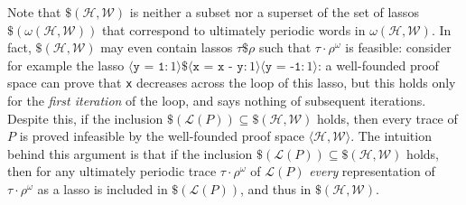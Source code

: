 \documentclass[9pt,nocopyrightspace]{sigplanconf}
\theoremstyle{definition}
\newcommand{\tuple}[1]{\langle #1 \rangle}
\newcommand{\rankformulas}{\mathscr{W}}
\newcommand{\ic}[2]{{\tuple{#1 : #2}}}
\newcommand{\lang}{\mathcal{L}}
\begin{document}
Note that $\$(\mathscr{H},\rankformulas)$ is neither a subset nor a superset of the set of
lassos $\$(\omega(\mathscr{H},\rankformulas))$ that correspond to ultimately periodic
words in $\omega(\mathscr{H},\rankformulas)$.  In fact, $\$(\mathscr{H},\rankformulas)$ may even
contain lassos $\tau\$\rho$ such that $\tau\cdot\rho^\omega$ is feasible:
consider for example the lasso $\ic{\texttt{y = 1}}{1} \$ \ic{\texttt{x = x -
    y}}{1}\ic{\texttt{y = -1}}{1}$: a well-founded proof space can prove
  that \texttt{x} decreases across the loop of this lasso, but this holds only
  for the \emph{first iteration} of the loop, and says nothing of subsequent
  iterations. Despite this, if the inclusion $\$(\lang(P)) \subseteq
  \$(\mathscr{H},\rankformulas)$ holds, then every trace of $P$ is proved infeasible by
  the well-founded proof space $\tuple{\mathscr{H},\rankformulas}$.  The intuition behind
  this argument is that if the inclusion $\$(\lang(P)) \subseteq
  \$(\mathscr{H},\rankformulas)$ holds, then for any ultimately periodic trace
  $\tau\cdot\rho^\omega$ of $\lang(P)$ \emph{every} representation of
  $\tau\cdot\rho^\omega$ as a lasso is included in $\$(\lang(P))$, and thus in
  $\$(\mathscr{H},\rankformulas)$.
\end{document}
